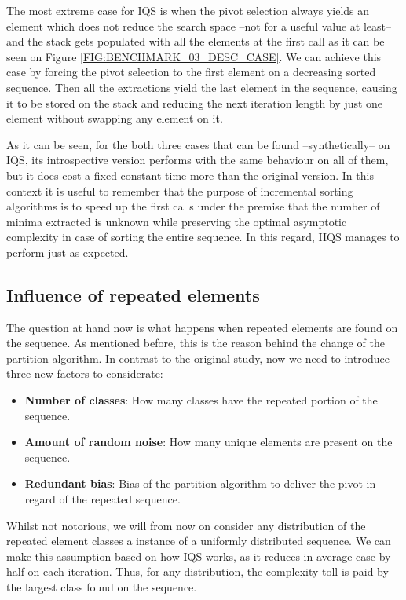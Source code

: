 The most extreme case for IQS is when the pivot selection always yields an element which does not reduce the search space --not for a useful value at least-- and the stack gets populated with all the elements at the first call as it can be seen on Figure \ref{FIG:BENCHMARK_03_DESC_CASE}. We can achieve this case by forcing the pivot selection to the first element on a decreasing sorted sequence. Then all the extractions yield the last element in the sequence, causing it to be stored on the stack and reducing the next iteration length by just one element without swapping any element on it.

As it can be seen, for the both three cases that can be found --synthetically-- on IQS, its introspective version performs with the same behaviour on all of them, but it does cost a fixed constant time more than the original version. In this context it is useful to remember that the purpose of incremental sorting algorithms is to speed up the first calls under the premise that the number of minima extracted is unknown while preserving the optimal asymptotic complexity in case of sorting the entire sequence. In this regard, IIQS manages to perform just as expected.

\subsection{Influence of repeated elements}

The question at hand now is what happens when repeated elements are found on the sequence. As mentioned before, this is the reason behind the change of the partition algorithm. In contrast to the original study, now we need to introduce three new factors to considerate:

\begin{itemize}
    \item \textbf{Number of classes}: How many classes have the repeated portion of the sequence.
    \item \textbf{Amount of random noise}: How many unique elements are present on the sequence.
    \item \textbf{Redundant bias}: Bias of the partition algorithm to deliver the pivot in regard of the repeated sequence.
\end{itemize}

Whilst not notorious, we will from now on consider any distribution of the repeated element classes a instance of a uniformly distributed sequence. We can make this assumption based on how IQS works, as it reduces in average case by half on each iteration. Thus, for any distribution, the complexity toll is paid by the largest class found on the sequence.

